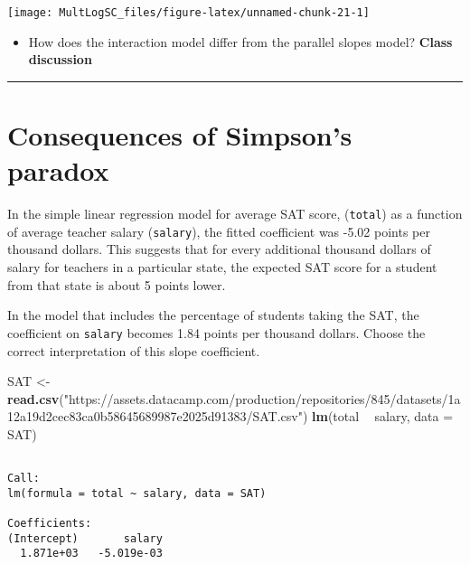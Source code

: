 \documentclass[]{book}
\newenvironment{Shaded}{\begin{snugshade}}{\end{snugshade}}
\newcommand{\KeywordTok}[1]{\textcolor[rgb]{0.13,0.29,0.53}{\textbf{#1}}}
\newcommand{\DataTypeTok}[1]{\textcolor[rgb]{0.13,0.29,0.53}{#1}}
\newcommand{\StringTok}[1]{\textcolor[rgb]{0.31,0.60,0.02}{#1}}
\newcommand{\OperatorTok}[1]{\textcolor[rgb]{0.81,0.36,0.00}{\textbf{#1}}}
\newcommand{\NormalTok}[1]{#1}
\providecommand{\tightlist}{%
  \setlength{\itemsep}{0pt}\setlength{\parskip}{0pt}}
\begin{document}
\begin{center}\texttt{[image: MultLogSC\_files/figure-latex/unnamed-chunk-21-1]} \end{center}

\begin{itemize}
\tightlist
\item
  How does the interaction model differ from the parallel slopes model?
  \textbf{Class discussion}
\end{itemize}

\begin{center}\rule{0.5\linewidth}{\linethickness}\end{center}

\section{Consequences of Simpson's
paradox}\label{consequences-of-simpsons-paradox}

In the simple linear regression model for average SAT score,
(\texttt{total}) as a function of average teacher salary
(\texttt{salary}), the fitted coefficient was -5.02 points per thousand
dollars. This suggests that for every additional thousand dollars of
salary for teachers in a particular state, the expected SAT score for a
student from that state is about 5 points lower.

In the model that includes the percentage of students taking the SAT,
the coefficient on \texttt{salary} becomes 1.84 points per thousand
dollars. Choose the correct interpretation of this slope coefficient.

\begin{Shaded}
\begin{Highlighting}[]
\NormalTok{SAT <-}\StringTok{ }\KeywordTok{read.csv}\NormalTok{(}\StringTok{"https://assets.datacamp.com/production/repositories/845/datasets/1a12a19d2cec83ca0b58645689987e2025d91383/SAT.csv"}\NormalTok{)}
\KeywordTok{lm}\NormalTok{(total }\OperatorTok{~}\StringTok{ }\NormalTok{salary, }\DataTypeTok{data =}\NormalTok{ SAT)}
\end{Highlighting}
\end{Shaded}

\begin{verbatim}

Call:
lm(formula = total ~ salary, data = SAT)

Coefficients:
(Intercept)       salary  
  1.871e+03   -5.019e-03  
\end{verbatim}
\end{document}
